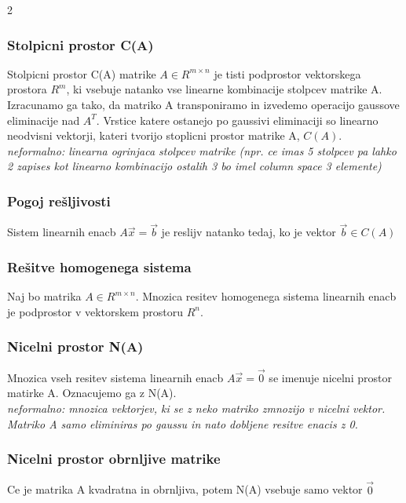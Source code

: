 \documentclass{article}
\begin{document}
\begin{multicols}{2}
	\subsubsection{Stolpicni prostor C(A)}

	Stolpicni prostor C(A) matrike $A \in R^{m \times n}$ je tisti podprostor
	vektorskega prostora $R^{m}$, ki vsebuje natanko vse linearne kombinacije stolpcev matrike A.\\
	Izracunamo ga tako, da matriko A transponiramo in izvedemo operacijo gaussove eliminacije nad $A^{T}$. Vrstice katere ostanejo po gaussivi eliminaciji
	so linearno neodvisni vektorji, kateri tvorijo stoplicni prostor matrike A, $C(A)$.
	\textit{neformalno: linearna ogrinjaca stolpcev matrike (npr. ce imas 5 stolpcev pa lahko 2 zapises kot linearno kombinacijo ostalih 3 bo imel column space 3 elemente)}

	\subsubsection{Pogoj rešljivosti}

	Sistem linearnih enacb $A\vec{x} = \vec{b}$ je reslijv natanko tedaj, ko je vektor
	$\vec{b} \in C(A)$

	\subsubsection{Rešitve homogenega sistema}

	Naj bo matrika $A \in R^{m \times n}$. Mnozica resitev homogenega sistema linearnih
	enacb je podprostor v vektorskem prostoru $R^{n}$.

	\subsubsection{Nicelni prostor N(A)}

	Mnozica vseh resitev sistema linearnih enacb $A\vec{x} = \vec{0}$ se imenuje nicelni
	prostor matirke A. Oznacujemo ga z N(A).\\
	\textit{neformalno: mnozica vektorjev, ki se z neko matriko zmnozijo v nicelni vektor. Matriko A samo eliminiras po gaussu in nato dobljene resitve enacis z 0.}

	\subsubsection{Nicelni prostor obrnljive matrike}

	Ce je matrika A kvadratna in obrnljiva, potem N(A) vsebuje samo vektor $\vec{0}$


\end{multicols}
\end{document}
